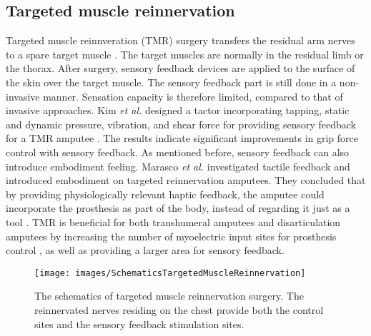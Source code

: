 \subsection{Targeted muscle reinnervation}
Targeted muscle reinnveration (TMR) surgery transfers the residual arm nerves to a spare target muscle \cite{kuiken2013targeted}. The target muscles are normally in the residual limb or the thorax.  
After surgery, sensory feedback devices are applied to the surface of the skin over the target muscle. The sensory feedback part is still done in a non-invasive manner. Sensation capacity is therefore limited, compared to that of invasive approaches.
Kim \textit{et al.} designed a tactor incorporating tapping, static and dynamic pressure, vibration, and shear force for providing sensory feedback for a TMR amputee \cite{kim2012haptic}. The results indicate significant improvements in grip force control with sensory feedback. As mentioned before, sensory feedback can also introduce embodiment feeling. Marasco \textit{et al.} investigated tactile feedback and introduced embodiment on targeted reinnervation amputees. They concluded that by providing physiologically relevant haptic feedback, the amputee could incorporate the prosthesis as part of the body, instead of regarding it just as a tool \cite{marasco2011robotic}. TMR is beneficial for both transhumeral amputees and disarticulation amputees by increasing the number of myoelectric input sites for prosthesis control \cite{miller2008improved, kuiken2004use}, as well as providing a larger area for sensory feedback. 


 \begin{figure}[htb]
    \centering
       \texttt{[image: images/SchematicsTargetedMuscleReinnervation]}
        \caption{The schematics of targeted muscle reinnervation surgery. The reinnervated nerves residing on the chest provide both the control sites and the sensory feedback stimulation sites.}
        \label{fig:graphical_representation_single_modalities}
\end{figure}


